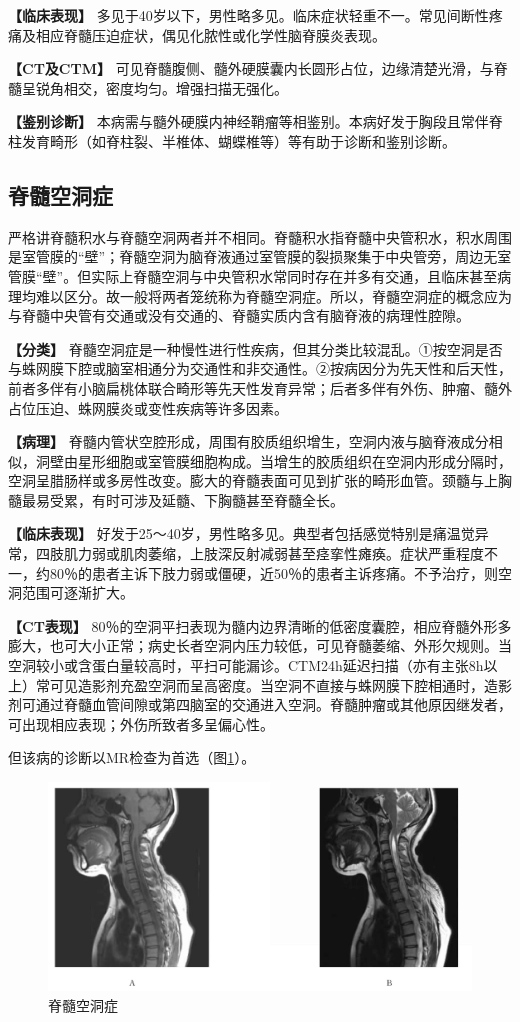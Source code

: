 \textbf{【临床表现】}
多见于40岁以下，男性略多见。临床症状轻重不一。常见间断性疼痛及相应脊髓压迫症状，偶见化脓性或化学性脑脊膜炎表现。

\textbf{【CT及CTM】}
可见脊髓腹侧、髓外硬膜囊内长圆形占位，边缘清楚光滑，与脊髓呈锐角相交，密度均匀。增强扫描无强化。

\textbf{【鉴别诊断】}
本病需与髓外硬膜内神经鞘瘤等相鉴别。本病好发于胸段且常伴脊柱发育畸形（如脊柱裂、半椎体、蝴蝶椎等）等有助于诊断和鉴别诊断。

\subsection{脊髓空洞症}

严格讲脊髓积水与脊髓空洞两者并不相同。脊髓积水指脊髓中央管积水，积水周围是室管膜的“壁”；脊髓空洞为脑脊液通过室管膜的裂损聚集于中央管旁，周边无室管膜“壁”。但实际上脊髓空洞与中央管积水常同时存在并多有交通，且临床甚至病理均难以区分。故一般将两者笼统称为脊髓空洞症。所以，脊髓空洞症的概念应为与脊髓中央管有交通或没有交通的、脊髓实质内含有脑脊液的病理性腔隙。

\textbf{【分类】}
脊髓空洞症是一种慢性进行性疾病，但其分类比较混乱。①按空洞是否与蛛网膜下腔或脑室相通分为交通性和非交通性。②按病因分为先天性和后天性，前者多伴有小脑扁桃体联合畸形等先天性发育异常；后者多伴有外伤、肿瘤、髓外占位压迫、蛛网膜炎或变性疾病等许多因素。

\textbf{【病理】}
脊髓内管状空腔形成，周围有胶质组织增生，空洞内液与脑脊液成分相似，洞壁由星形细胞或室管膜细胞构成。当增生的胶质组织在空洞内形成分隔时，空洞呈腊肠样或多房性改变。膨大的脊髓表面可见到扩张的畸形血管。颈髓与上胸髓最易受累，有时可涉及延髓、下胸髓甚至脊髓全长。

\textbf{【临床表现】}
好发于25～40岁，男性略多见。典型者包括感觉特别是痛温觉异常，四肢肌力弱或肌肉萎缩，上肢深反射减弱甚至痉挛性瘫痪。症状严重程度不一，约80％的患者主诉下肢力弱或僵硬，近50％的患者主诉疼痛。不予治疗，则空洞范围可逐渐扩大。

\textbf{【CT表现】}
80％的空洞平扫表现为髓内边界清晰的低密度囊腔，相应脊髓外形多膨大，也可大小正常；病史长者空洞内压力较低，可见脊髓萎缩、外形欠规则。当空洞较小或含蛋白量较高时，平扫可能漏诊。CTM24h延迟扫描（亦有主张8h以上）常可见造影剂充盈空洞而呈高密度。当空洞不直接与蛛网膜下腔相通时，造影剂可通过脊髓血管间隙或第四脑室的交通进入空洞。脊髓肿瘤或其他原因继发者，可出现相应表现；外伤所致者多呈偏心性。

但该病的诊断以MR检查为首选（图\ref{fig23-3}）。

\begin{figure}[!htbp]
 \centering
 \includegraphics[width=.7\textwidth,height=\textheight,keepaspectratio]{./images/Image00466.jpg}
 \captionsetup{justification=centering}
 \caption{脊髓空洞症}
 \label{fig23-3}
  \end{figure} 

